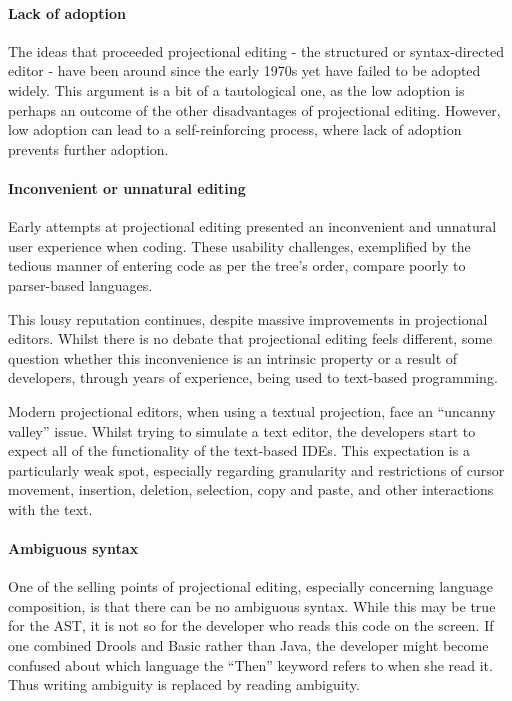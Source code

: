 \paragraph{Lack of adoption}
The ideas that proceeded projectional editing - the structured or syntax-directed editor - have been around since the early 1970s yet have failed to be adopted widely.
This argument is a bit of a tautological one, as the low adoption is perhaps an outcome of the other disadvantages of projectional editing.
However, low adoption can lead to a self-reinforcing process, where lack of adoption prevents further adoption.

\paragraph{Inconvenient or unnatural editing}
Early attempts at projectional editing presented an inconvenient and unnatural user experience when coding.
These usability challenges, exemplified by the tedious manner of entering code as per the tree's order, compare poorly to parser-based languages.

This lousy reputation continues, despite massive improvements in projectional editors.
Whilst there is no debate that projectional editing feels different, some question whether this inconvenience is an intrinsic property or a result of developers, through years of experience, being used to text-based programming.

Modern projectional editors, when using a textual projection, face an ``uncanny valley'' issue.
Whilst trying to simulate a text editor, the developers start to expect all of the functionality of the text-based IDEs.
This expectation is a particularly weak spot, especially regarding granularity and restrictions of cursor movement, insertion, deletion, selection, copy and paste, and other interactions with the text.

\paragraph{Ambiguous syntax}
One of the selling points of projectional editing, especially concerning language composition, is that there can be no ambiguous syntax.
While this may be true for the AST, it is not so for the developer who reads this code on the screen.
If one combined Drools and Basic rather than Java, the developer might become confused about which language the ``Then'' keyword refers to when she read it.
Thus writing ambiguity is replaced by reading ambiguity.


